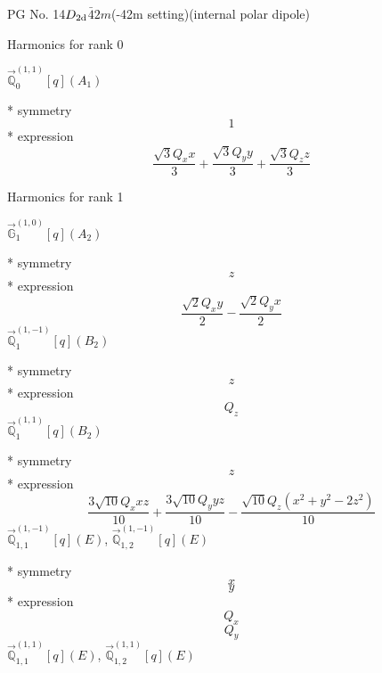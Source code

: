 \documentclass[fleqn,8pt]{jsarticle}
\begin{document}
\setcounter{MaxMatrixCols}{32}

\renewcommand{\tablename}{Table~}
\renewcommand{\figurename}{Figure~}
\begin{center}
\LARGE
PG No. 14\quad$D_{\rm 2d}$\quad$\bar{4}2m$\quad(-42m setting)\quad[ tetragonal ] (internal polar dipole)
\end{center}

\noindent * Harmonics for rank 0

\noindent\quad $\vec{\mathbb{Q}}_{0}^{(1,1)}[q](A_{1})$

\noindent\quad ** symmetry
\begin{dmath*}
1
\end{dmath*}
\noindent\quad ** expression
\begin{dmath*}
\frac{\sqrt{3} Q_{x} x}{3} + \frac{\sqrt{3} Q_{y} y}{3} + \frac{\sqrt{3} Q_{z} z}{3}
\end{dmath*}

\noindent * Harmonics for rank 1

\noindent\quad $\vec{\mathbb{G}}_{1}^{(1,0)}[q](A_{2})$

\noindent\quad ** symmetry
\begin{dmath*}
z
\end{dmath*}
\noindent\quad ** expression
\begin{dmath*}
\frac{\sqrt{2} Q_{x} y}{2} - \frac{\sqrt{2} Q_{y} x}{2}
\end{dmath*}
\noindent\quad $\vec{\mathbb{Q}}_{1}^{(1,-1)}[q](B_{2})$

\noindent\quad ** symmetry
\begin{dmath*}
z
\end{dmath*}
\noindent\quad ** expression
\begin{dmath*}
Q_{z}
\end{dmath*}
\noindent\quad $\vec{\mathbb{Q}}_{1}^{(1,1)}[q](B_{2})$

\noindent\quad ** symmetry
\begin{dmath*}
z
\end{dmath*}
\noindent\quad ** expression
\begin{dmath*}
\frac{3 \sqrt{10} Q_{x} x z}{10} + \frac{3 \sqrt{10} Q_{y} y z}{10} - \frac{\sqrt{10} Q_{z} \left(x^{2} + y^{2} - 2 z^{2}\right)}{10}
\end{dmath*}
\noindent\quad $\vec{\mathbb{Q}}_{1,1}^{(1,-1)}[q](E)$, $\vec{\mathbb{Q}}_{1,2}^{(1,-1)}[q](E)$

\noindent\quad ** symmetry
\begin{dmath*}
x
\end{dmath*}
\begin{dmath*}
y
\end{dmath*}
\noindent\quad ** expression
\begin{dmath*}
Q_{x}
\end{dmath*}
\begin{dmath*}
Q_{y}
\end{dmath*}
\noindent\quad $\vec{\mathbb{Q}}_{1,1}^{(1,1)}[q](E)$, $\vec{\mathbb{Q}}_{1,2}^{(1,1)}[q](E)$
\end{document}
